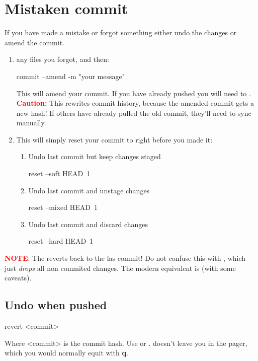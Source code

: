 \section{Mistaken commit}
If you have made a mistake or forgot something either undo the changes or amend the commit.
\begin{enumerate}
    \item {} any files you forgot, and then:
    \begin{gitBashBox}
    commit --amend -m "your message"
    \end{gitBashBox}
    This will amend your commit. If you have already pushed you will need to . \textcolor{red}{\bfseries Caution:} This rewrites commit history, because the amended commit gets a new hash! If others have already pulled the old commit, they’ll need to sync manually.
\item This will simply reset your commit to right before you made it:\footnotemark[4]
    \begin{enumerate}
    \item Undo last commit but keep changes staged
    \begin{gitBashBox}
reset --soft HEAD~1
    \end{gitBashBox}
    \item Undo last commit and unstage changes
    \begin{gitBashBox}
reset --mixed HEAD~1
    \end{gitBashBox}
    \item Undo last commit and discard changes
    \begin{gitBashBox}
reset --hard HEAD~1
    \end{gitBashBox}
\end{enumerate}
\end{enumerate}
\begin{tcolorbox}[infoBox]
        \textcolor{red}{\textbf{NOTE}}: The  reverts back to the las commit! Do not confuse this with , which just \textit{drops} all non commited changes. The modern equivalent is  (with some caveats).
\end{tcolorbox}


\subsection{Undo when pushed}
\begin{gitBashBox}
revert <commit>
\end{gitBashBox}
Where <commit> is the commit hash.
Use  or .
 doesn't leave you in the pager, which you would normally equit with \textbf{q}.


